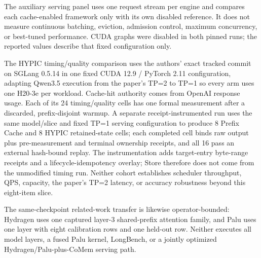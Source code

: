 \documentclass{article}
\begin{document}
The auxiliary serving panel uses one request stream per engine and compares
each cache-enabled framework only with its own disabled reference.  It does not
measure continuous batching, eviction, admission control, maximum concurrency,
or best-tuned performance.  CUDA graphs were disabled in both pinned runs; the
reported values describe that fixed configuration only.

The HYPIC timing/quality comparison uses the authors' exact tracked commit on
SGLang 0.5.14 in one fixed CUDA 12.9 / PyTorch 2.11 configuration, adapting
Qwen3.5 execution from the paper's TP=2 to TP=1 so every arm uses one H20-3e per
workload.  Cache-hit authority comes from OpenAI response usage.  Each of its 24
timing/quality cells has one formal measurement after a discarded,
prefix-disjoint warmup.  A separate receipt-instrumented run uses the same
model/slice and fixed TP=1 serving configuration to produce 8 Prefix Cache and
8 HYPIC retained-state cells; each completed cell binds raw output plus
pre-measurement and terminal ownership receipts, and all 16 pass an external
hash-bound replay.  The instrumentation adds target-entry byte-range receipts
and a lifecycle-idempotency overlay; Store therefore does not come from the
unmodified timing run.  Neither cohort establishes scheduler throughput, QPS,
capacity, the paper's TP=2 latency, or accuracy robustness beyond this
eight-item slice.

The same-checkpoint related-work transfer is likewise operator-bounded:
Hydragen uses one captured layer-3 shared-prefix attention family, and Palu
uses one layer with eight calibration rows and one held-out row.  Neither
executes all model layers, a fused Palu kernel, LongBench, or a jointly
optimized Hydragen/Palu-plus-CoMem serving path.
\end{document}
